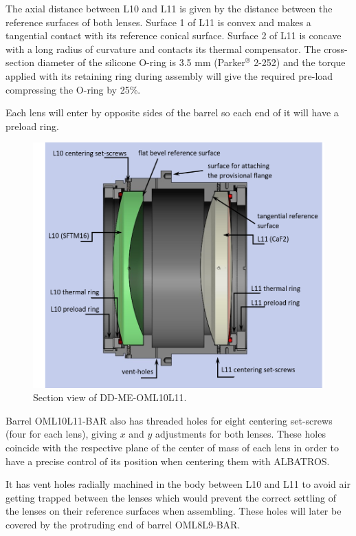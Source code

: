 \documentclass{report}
\begin{document}
The axial distance between L10 and L11 is given by the distance between the reference surfaces of both lenses. Surface 1 of L11 is convex and makes a tangential contact with its reference conical surface. Surface 2 of L11 is concave with a long radius of curvature and contacts its thermal compensator. The cross-section diameter of the silicone O-ring is 3.5 mm (Parker${}^\circledR$ 2-252) and the torque applied with its retaining ring during assembly will give the required pre-load compressing the O-ring by 25\%.

Each lens will enter by opposite sides of the barrel so each end of it will have a preload ring.

\begin{figure}
\begin{center}
\includegraphics[width=0.9\linewidth]{figures/DD-OML10L11_secview.png}
\end{center}
\caption{Section view of DD-ME-OML10L11.}
\label{figure:WOB-L10L11-SV}
\end{figure}

Barrel OML10L11-BAR also has threaded holes for eight centering set-screws (four for each lens), giving $x$ and $y$ adjustments for both lenses. These holes coincide with the respective plane of the center of mass of each lens in order to have a precise control of its position when centering them with ALBATROS.

It has vent holes radially machined in the body between L10 and L11 to avoid air getting trapped between the lenses which would prevent the correct settling of the lenses on their reference surfaces when assembling. These holes will later be covered by the protruding end of barrel OML8L9-BAR.
\end{document}
